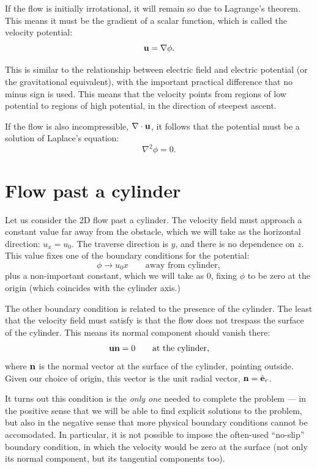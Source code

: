 If the flow is initially irrotational, it will remain so due to
Lagrange's theorem. This means it must be the gradient of a scalar
function, which is called the velocity potential:
\[
\mathbf{u} = \nabla \phi .
\]

This is similar to the relationship between electric field and
electric potential (or the gravitational equivalent), with the
important practical difference that no minus sign is used. This means
that the velocity points from regions of low potential to regions of
high potential, in the direction of steepest ascent.

If the flow is also incompressible, $\nabla\cdot\mathbf{u}$, it follows that
the potential must be a solution of Laplace's equation:
\[
\nabla^2 \phi =0 .
\]



\section{Flow past a cylinder}

Let us consider the 2D flow past a cylinder. The velocity field must
approach a constant value far away from the obstacle, which we will
take as the horizontal direction: $u_x = u_0 $. The traverse direction
is $y$, and there is no dependence on $z$. This value fixes one of the
boundary conditions for the potential:
\[
\phi \to u_0 x \qquad \text{away from cylinder} ,
\]
plus a non-important constant, which we will take as $0$, fixing
$\phi$ to be zero at the origin (which coincides with the cylinder
axis.)

The other boundary condition is related to the presence of the
cylinder. The least that the velocity field must satisfy is that the
flow does not trespass the surface of the cylinder. This means its
normal component should vanish there:
\[
\mathbf{u} \mathbf{n} = 0  \qquad \text{at the cylinder} ,
\]
where $\mathbf{n}$ is the normal vector at the surface of the cylinder,
pointing outside. Given our choice of origin, this vector is the unit
radial vector, $\mathbf{n} = \hat{\mathbf{e}}_r$.

It turns out this condition is the \emph{only one} needed to complete
the problem --- in the positive sense that we will be able to find
explicit solutions to the problem, but also in the negative sense that
more physical boundary conditions cannot be accomodated. In
particular, it is not possible to impose the often-used ``no-slip''
boundary condition, in which the velocity would be zero at the surface
(not only its normal component, but its tangential components too).

